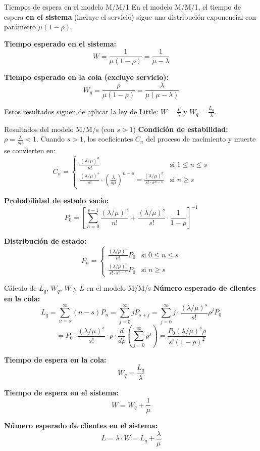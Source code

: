 \documentclass{beamer}
\begin{document}
\begin{frame}{Tiempos de espera en el modelo M/M/1}
\justifying
En el modelo M/M/1, el tiempo de espera \textbf{en el sistema} (incluye el servicio) sigue una distribución exponencial con parámetro $\mu(1 - \rho)$.

\medskip
\textbf{Tiempo esperado en el sistema:}
\[
W = \frac{1}{\mu(1 - \rho)} = \frac{1}{\mu - \lambda}
\]

\textbf{Tiempo esperado en la cola (excluye servicio):}
\[
W_q = \frac{\rho}{\mu(1 - \rho)} = \frac{\lambda}{\mu(\mu - \lambda)}
\]

\medskip
Estos resultados siguen de aplicar la ley de Little: $W = \frac{L}{\lambda}$ y $W_q = \frac{L_q}{\lambda}$.
\end{frame}

\begin{frame}{Resultados del modelo M/M/s (con $s > 1$)}
\justifying
\textbf{Condición de estabilidad: } $ \rho = \frac{\lambda}{s\mu} < 1 $. Cuando $s > 1$, los coeficientes $C_n$ del proceso de nacimiento y muerte se convierten en:
\[
C_n = 
\begin{cases}
\displaystyle \frac{(\lambda/\mu)^n}{n!} & \text{si } 1 \leq n \leq s \\[1.5ex]
\displaystyle \frac{(\lambda/\mu)^s}{s!} \cdot \left( \frac{\lambda}{s\mu} \right)^{n - s} = \frac{(\lambda/\mu)^n}{s! \cdot s^{n - s}} & \text{si } n \geq s
\end{cases}
\]

\medskip
\textbf{Probabilidad de estado vacío:}
\[
P_0 = \left[ \sum_{n=0}^{s-1} \frac{(\lambda/\mu)^n}{n!} + \frac{(\lambda/\mu)^s}{s!} \cdot \frac{1}{1 - \rho} \right]^{-1}
\]

\textbf{Distribución de estado:}
\[
P_n = 
\begin{cases}
\displaystyle \frac{(\lambda/\mu)^n}{n!} P_0 & \text{si } 0 \leq n \leq s \\[1.5ex]
\displaystyle \frac{(\lambda/\mu)^n}{s! \cdot s^{n - s}} P_0 & \text{si } n \geq s
\end{cases}
\]

\end{frame}

\begin{frame}{Cálculo de $L_q$, $W_q$, $W$ y $L$ en el modelo M/M/s}
\justifying
\textbf{Número esperado de clientes en la cola:}
\[
L_q = \sum_{n=s}^{\infty} (n - s)P_n
= \sum_{j=0}^{\infty} j P_{s+j}
= \sum_{j=0}^{\infty} j \cdot \frac{(\lambda/\mu)^s}{s!} \rho^j P_0
\]
\[
= P_0 \cdot \frac{(\lambda/\mu)^s}{s!} \cdot \rho \cdot \frac{d}{d\rho} \left( \sum_{j=0}^{\infty} \rho^j \right)
= \frac{P_0 (\lambda/\mu)^s \rho}{s! (1 - \rho)^2}
\]

\textbf{Tiempo de espera en la cola:}
\[
W_q = \frac{L_q}{\lambda}
\]

\textbf{Tiempo de espera en el sistema:}
\[
W = W_q + \frac{1}{\mu}
\]

\textbf{Número esperado de clientes en el sistema:}
\[
L = \lambda \cdot W = L_q + \frac{\lambda}{\mu}
\]
\end{frame}
\end{document}
